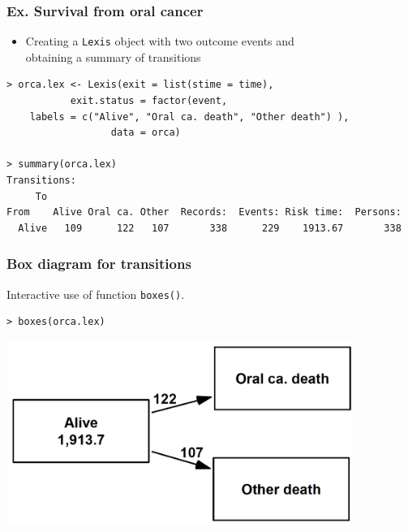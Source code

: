 \documentclass[handout,12pt]{beamer}
\begin{document}
\begin{frame}[fragile]
\frametitle{Ex. Survival from oral cancer}

\begin{itemize}
\item
Creating a {\tt Lexis} object with two outcome events and \\ 
obtaining a summary of transitions
\end{itemize}
\small
\begin{verbatim}
> orca.lex <- Lexis(exit = list(stime = time), 
           exit.status = factor(event, 
    labels = c("Alive", "Oral ca. death", "Other death") ),
                  data = orca)

> summary(orca.lex)  
Transitions:
     To
From    Alive Oral ca. Other  Records:  Events: Risk time:  Persons:
  Alive   109      122   107       338      229    1913.67       338
\end{verbatim}
\normalsize

\end{frame}

\begin{frame}[fragile]
\frametitle{Box diagram for transitions}

Interactive use of function {\tt boxes()}.
\small
\begin{verbatim}
> boxes(orca.lex)
\end{verbatim}
\begin{center}
\includegraphics[height=6cm]{orca-boxes}
\end{center}
\normalsize

\end{frame}
\end{document}
